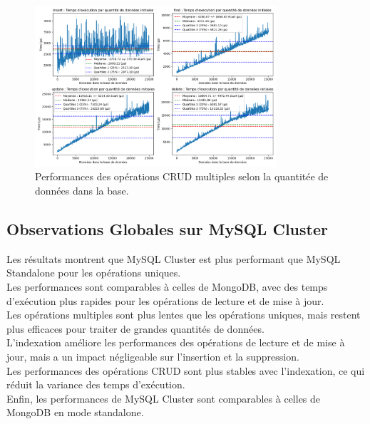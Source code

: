 \documentclass[12pt,a4paper]{report}
\begin{document}
                \begin{figure}[H]
                    \centering
                    \includegraphics[width=0.8\textwidth]{../plots/MySQL/sharding_indexed/test_many_various_data.png}
                    \caption{Performances des opérations CRUD multiples selon la quantitée de données dans la base.}
                    \label{fig:mysql_cluster_global_many_various_indexed}
                \end{figure}

        \subsection{Observations Globales sur MySQL Cluster} 
            \begin{card}
                Les résultats montrent que MySQL Cluster est plus performant que MySQL Standalone pour les opérations uniques. \\
                Les performances sont comparables à celles de MongoDB, avec des temps d'exécution plus rapides pour les opérations de lecture et de mise à jour. \\
                Les opérations multiples sont plus lentes que les opérations uniques, mais restent plus efficaces pour traiter de grandes quantités de données. \\
                L'indexation améliore les performances des opérations de lecture et de mise à jour, mais a un impact négligeable sur l'insertion et la suppression. \\
                Les performances des opérations CRUD sont plus stables avec l'indexation, ce qui réduit la variance des temps d'exécution. \\
                Enfin, les performances de MySQL Cluster sont comparables à celles de MongoDB en mode standalone. \\
            \end{card}
\end{document}
